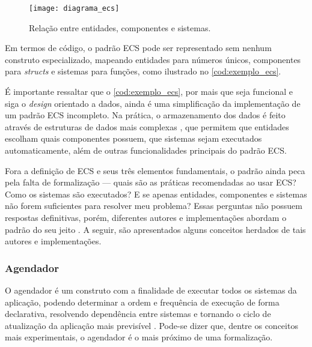\begin{figure}[H]
	\centering
	\texttt{[image: diagrama\_ecs]}
	\caption{Relação entre entidades, componentes e sistemas.}
	\label{fig:diagrama_ecs}
\end{figure}

Em termos de código, o padrão ECS pode ser representado sem nenhum construto especializado, mapeando entidades para números únicos, componentes para \textit{structs} e sistemas para funções, como ilustrado no \autoref{cod:exemplo_ecs}.

\codigoRust

\vspace{-1em}

É importante ressaltar que o \autoref{cod:exemplo_ecs}, por mais que seja funcional e siga o \textit{design} orientado a dados, ainda é uma simplificação da implementação de um padrão ECS incompleto. Na prática, o armazenamento dos dados é feito através de estruturas de dados mais complexas \cite{ecsstorageinpics}, que permitem que entidades escolham quais componentes possuem, que sistemas sejam executados automaticamente, além de outras funcionalidades principais do padrão ECS.

Fora a definição de ECS e seus três elementos fundamentais, o padrão ainda peca pela falta de formalização — quais são as práticas recomendadas ao usar ECS? Como os sistemas são executados? E se apenas entidades, componentes e sistemas não forem suficientes para resolver meu problema? Essas perguntas não possuem respostas definitivas, porém, diferentes autores e implementações abordam o padrão do seu jeito \cite{bevy, flecs}. A seguir, são apresentados alguns conceitos herdados de tais autores e implementações.

\subsubsection{Agendador}

O agendador é um construto com a finalidade de executar todos os sistemas da aplicação, podendo determinar a ordem e frequência de execução de forma declarativa, resolvendo dependência entre sistemas e tornando o ciclo de atualização da aplicação mais previsível \cite{bevy}. Pode-se dizer que, dentre os conceitos mais experimentais, o agendador é o mais próximo de uma formalização.

